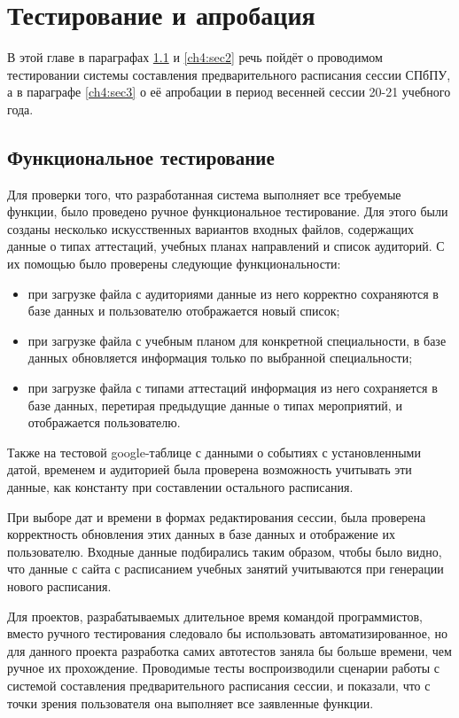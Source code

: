\chapter{Тестирование и апробация} \label{ch4}

В этой главе в параграфах \ref{ch4:sec1} и \ref{ch4:sec2} речь пойдёт о проводимом тестировании системы составления предварительного расписания сессии СПбПУ, а в параграфе \ref{ch4:sec3} о её апробации в период весенней сессии 20-21 учебного года.

\section{Функциональное тестирование} \label{ch4:sec1}
Для проверки того, что разработанная система выполняет все требуемые функции, было проведено ручное функциональное тестирование. Для этого были созданы несколько искусственных вариантов входных файлов, содержащих данные о типах аттестаций, учебных планах направлений и список аудиторий. С их помощью было проверены следующие функциональности:
\begin{itemize}
\item при загрузке файла с аудиториями данные из него корректно сохраняются в базе данных и пользователю отображается новый список;
\item при загрузке файла с учебным планом для конкретной специальности, в базе данных обновляется информация только по выбранной специальности;
\item при загрузке файла с типами аттестаций информация из него сохраняется в базе данных, перетирая предыдущие данные о типах мероприятий, и отображается пользователю.
\end{itemize} 	

Также на тестовой google-таблице с данными о событиях с установленными датой, временем и аудиторией была проверена возможность учитывать эти данные, как константу при составлении остального расписания.

При выборе дат и времени в формах редактирования сессии, была проверена корректность обновления этих данных в базе данных и отображение их пользователю. Входные данные подбирались таким образом, чтобы было видно, что данные с сайта с расписанием учебных занятий \cite{ruz} учитываются при генерации нового расписания.

Для проектов, разрабатываемых длительное время командой программистов, вместо ручного тестирования следовало бы использовать автоматизированное, но для данного проекта разработка самих автотестов заняла бы больше времени, чем ручное их прохождение. Проводимые тесты воспроизводили сценарии работы с системой составления предварительного расписания сессии, и показали, что с точки зрения пользователя она выполняет все заявленные функции.

